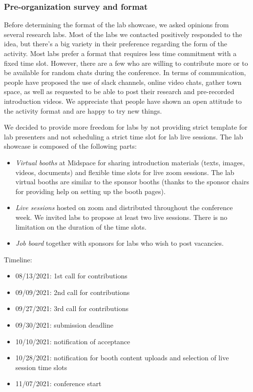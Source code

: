 \documentclass[%
10pt,								%
titlepage,						%
]
{scrartcl}
\begin{document}
        \subsubsection{Pre-organization survey and format}
            Before determining the format of the lab showcase, we asked opinions from several research labs. Most of the labs we contacted positively responded to the idea, but there's a big variety in their preference regarding the form of the activity. Most labs prefer a format that requires less time commitment with a fixed time slot. However, there are a few who are willing to contribute more or to be available for random chats during the conference. In terms of communication, people have proposed the use of slack channels, online video chats, gather town space, as well as requested to be able to post their research and pre-recorded introduction videos. We appreciate that people have shown an open attitude to the activity format and are happy to try new things.
            
We decided to provide more freedom for labs by not providing strict template for lab presenters and not scheduling a strict time slot for lab live sessions. The lab showcase is composed of the following parts:
            \begin{itemize}
                \item \textit{Virtual booths} at Midspace for sharing introduction materials (texts, images, videos, documents) and flexible time slots for live zoom sessions. The lab virtual booths are similar to the sponsor booths (thanks to the sponsor chairs for providing help on setting up the booth pages).
                \item \textit{Live sessions} hosted on zoom and distributed throughout the conference week. We invited labs to propose at least two live sessions. There is no limitation on the duration of the time slots.
                \item \textit{Job board} together with sponsors for labs who wish to post vacancies.
            \end{itemize}
            
            Timeline:
            \begin{itemize}
                \item   08/13/2021: 1st call for contributions
                \item   09/09/2021: 2nd call for contributions
                \item   09/27/2021: 3rd call for contributions
                \item   09/30/2021: submission deadline
                \item   10/10/2021: notification of acceptance
                \item   10/28/2021: notification for booth content uploads and selection of live session time slots
                \item   11/07/2021: conference start
            \end{itemize}
            
\end{document}
